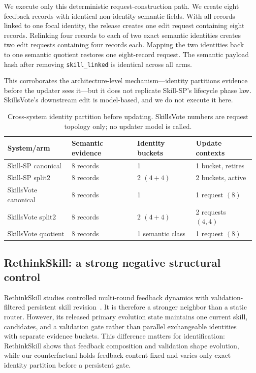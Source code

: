 We execute only this deterministic request-construction path. We create eight feedback records with identical non-identity semantic fields. With all records linked to one focal identity, the release creates one edit request containing eight records. Relinking four records to each of two exact semantic identities creates two edit requests containing four records each. Mapping the two identities back to one semantic quotient restores one eight-record request. The semantic payload hash after removing \texttt{skill\_linked} is identical across all arms.

This corroborates the architecture-level mechanism---identity partitions evidence before the updater sees it---but it does not replicate Skill-SP's lifecycle phase law. SkillsVote's downstream edit is model-based, and we do not execute it here.

\begin{table}[t]
\centering
\caption{Cross-system identity partition before updating. SkillsVote numbers are request topology only; no updater model is called.}
\label{tab:crosssystem}
\small
\begin{tabular}{llll}
\toprule
System/arm & Semantic evidence & Identity buckets & Update contexts\\
\midrule
Skill-SP canonical & 8 records & 1 & 1 bucket, retires\\
Skill-SP split2 & 8 records & 2 $(4+4)$ & 2 buckets, active\\
SkillsVote canonical & 8 records & 1 & 1 request $(8)$\\
SkillsVote split2 & 8 records & 2 $(4+4)$ & 2 requests $(4,4)$\\
SkillsVote quotient & 8 records & 1 semantic class & 1 request $(8)$\\
\bottomrule
\end{tabular}
\end{table}

\subsection{RethinkSkill: a strong negative structural control}

RethinkSkill studies controlled multi-round feedback dynamics with validation-filtered persistent skill revision~\citep{liu2026rethinkskill}. It is therefore a stronger neighbor than a static router. However, its released primary evolution state maintains one current skill, candidates, and a validation gate rather than parallel exchangeable identities with separate evidence buckets. This difference matters for identification: RethinkSkill shows that feedback composition and validation shape evolution, while our counterfactual holds feedback content fixed and varies only exact identity partition before a persistent gate.

